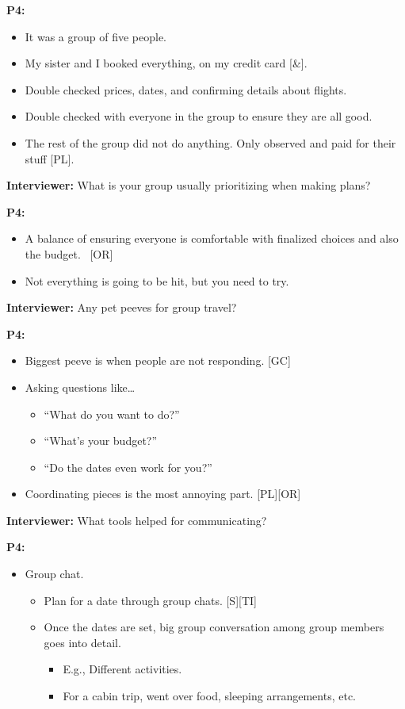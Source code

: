 \documentclass[12pt,a4paper]{article}
\begin{document}
\textbf{P4:}

\begin{itemize}
    \item It was a group of five people. 
    \item My sister and I booked everything, on my credit card [\&]. 
    \item Double checked prices, dates, and confirming details about flights. 
    \item Double checked with everyone in the group to ensure they are all good. 
    \item The rest of the group did not do anything. Only observed and paid for their stuff [PL]. 
\end{itemize}

\textbf{Interviewer: }What is your group usually prioritizing when making plans?  

\textbf{P4:}

\begin{itemize}
    \item A balance of ensuring everyone is comfortable with finalized choices and also the budget.  [OR]
    \item Not everything is going to be hit, but you need to try. 
\end{itemize}

\textbf{Interviewer: }Any pet peeves for group travel? 

\textbf{P4:}

\begin{itemize}
    \item Biggest peeve is when people are not responding. [GC]
    \item Asking questions like…
    \begin{itemize}
        \item “What do you want to do?”
        \item “What’s your budget?”
        \item “Do the dates even work for you?”
    \end{itemize}
    \item Coordinating pieces is the most annoying part. [PL][OR]
\end{itemize}

\textbf{Interviewer: }What tools helped for communicating? 

\textbf{P4:}

\begin{itemize}
    \item Group chat.
    \begin{itemize}
        \item Plan for a date through group chats. [S][TI] 
        \item Once the dates are set, big group conversation among group members goes into detail.
        \begin{itemize}
            \item E.g., Different activities. 
            \item For a cabin trip, went over food, sleeping arrangements, etc. 
        \end{itemize}
    \end{itemize}
\end{itemize}
\end{document}
